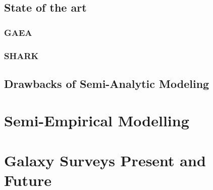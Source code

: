 \subsection{State of the art}
\subsubsection{GAEA}

\subsubsection{SHARK}


\subsection{Drawbacks of Semi-Analytic Modeling}



\section{Semi-Empirical Modelling}
\label{sec:SEM}



\section{Galaxy Surveys Present and Future}
\label{sec:Surveys}





